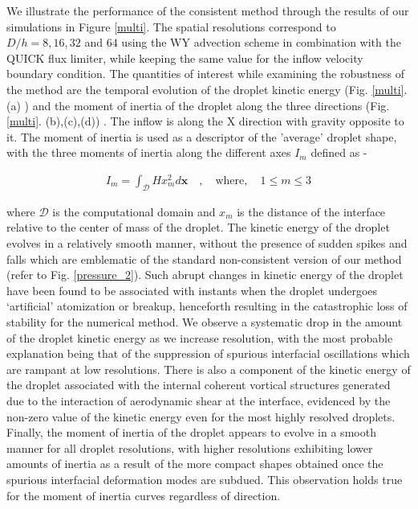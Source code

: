 We illustrate the performance of the consistent method through the 
results of our simulations in Figure \ref{multi}. 
The spatial resolutions correspond to $D/h = 8, 16, 32 $ and $64$ 
using the WY advection scheme in combination with the QUICK flux limiter, 
while keeping the same value for the inflow velocity boundary condition. 
The quantities of interest while examining the robustness of the 
method are the temporal evolution of the droplet kinetic energy 
(Fig. \ref{multi}. (a) ) and the moment of inertia of the droplet 
along the three directions (Fig. \ref{multi}. (b),(c),(d)) . 
The inflow is along the X direction with gravity opposite to it. 
The moment of inertia is used as a descriptor of the 'average' droplet shape, 
with the three moments of inertia along the different axes $I_m$ defined as - 


\begin{align}
	I_m = \int_{\mathcal{D}} H x_m^2 d \boldsymbol{x} \quad , \quad \text{where}, \quad 1 \le m \le 3
\end{align}

where $\mathcal{D}$ is the computational domain and $x_m$ is the 
distance of the interface relative to the center of mass of the droplet.   
The kinetic energy of the droplet evolves in a relatively smooth manner, 
without the presence of sudden spikes and falls which are emblematic of 
the standard non-consistent version of our method (refer to Fig. \ref{pressure_2}). 
Such abrupt changes in kinetic energy of the droplet have been 
found to be associated with instants when the droplet undergoes 
`artificial' atomization or breakup, henceforth resulting in 
the catastrophic loss of stability for the numerical method. 
We observe a systematic drop in the amount of the droplet 
kinetic energy as we increase resolution, with the most probable explanation 
being that of the suppression of spurious interfacial 
oscillations which are rampant at low resolutions. 
There is also a component of the kinetic energy of the droplet 
associated with the internal coherent vortical structures generated due to 
the interaction of aerodynamic shear at the interface, 
evidenced by the non-zero value of the kinetic 
energy even for the most highly resolved droplets. 
Finally, the moment of inertia of the droplet appears to evolve 
in a smooth manner for all droplet resolutions, with higher 
resolutions exhibiting lower amounts of inertia as a result of 
the more compact shapes obtained once the 
spurious interfacial deformation modes are subdued. 
This observation holds true for the moment of inertia curves regardless of direction.           


